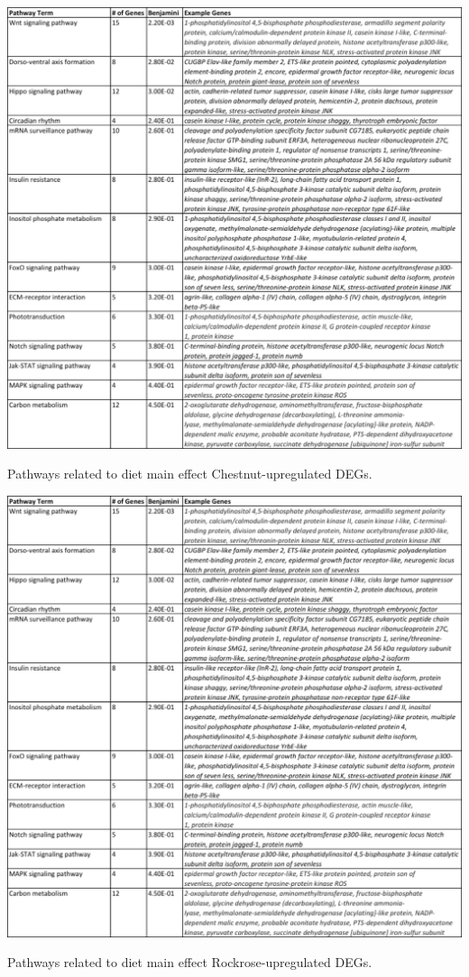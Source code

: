 \documentclass[11pt,a4paper,oldfontcommands,openany]{memoir}
\numberwithin{equation}{section} %
\begin{document}
\begin{table}[H]
  \includegraphics[width=\textwidth]{Images/ChestnutPathways}
  \caption{Pathways related to diet main effect Chestnut-upregulated DEGs.}
  \label{tbl:ChestnutPathways}
\end{table}

\begin{table}[H]
  \includegraphics[width=\textwidth]{Images/ChestnutPathways}
  \caption{Pathways related to diet main effect Rockrose-upregulated DEGs.}
  \label{tbl:RockrosePathways}
\end{table}
\end{document}
